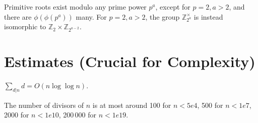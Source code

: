 	Primitive roots exist modulo any prime power $p^a$, except for $p = 2, a > 2$, and there are $\phi(\phi(p^a))$ many.
	For $p = 2, a > 2$, the group $\mathbb Z_{2^a}^\times$ is instead isomorphic to $\mathbb Z_2 \times \mathbb Z_{2^{a-2}}$.

\section{Estimates (Crucial for Complexity)}
	$\sum_{d|n} d = O(n \log \log n)$.

	The number of divisors of $n$ is at most around 100 for $n < 5e4$, 500 for $n < 1e7$, 2000 for $n < 1e10$, 200\,000 for $n < 1e19$.

% 
% 
% 
